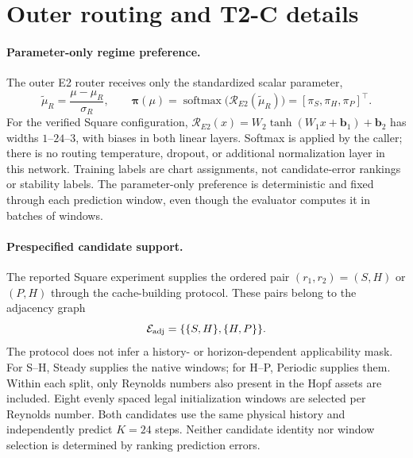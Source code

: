 \section{Outer routing and T2-C details}
\label{app:routing}

\paragraph{Parameter-only regime preference.}
The outer E2 router receives only the standardized scalar parameter,
\begin{equation}
  \widetilde\mu_R=\frac{\mu-\mu_R}{\sigma_R},\qquad
  \bm\pi(\mu)=\operatorname{softmax}
    \bigl(\mathcal R_{E2}(\widetilde\mu_R)\bigr)
  =[\pi_S,\pi_H,\pi_P]^\top.
  \label{eq:app_e2_parameter_only}
\end{equation}
For the verified Square configuration,
$\mathcal R_{E2}(x)=W_2\tanh(W_1x+\bm b_1)+\bm b_2$
has widths $1$--$24$--$3$, with biases in both linear layers.
Softmax is applied by the caller; there is no routing temperature,
dropout, or additional normalization layer in this network.
Training labels are chart assignments, not candidate-error rankings
or stability labels. The parameter-only preference is deterministic
and fixed through each prediction window, even though the evaluator
computes it in batches of windows.

\paragraph{Prespecified candidate support.}
The reported Square experiment supplies the ordered pair
$(r_1,r_2)=(S,H)$ or $(P,H)$ through the cache-building protocol.
These pairs belong to the adjacency graph
\begin{equation}
  \mathcal E_{\rm adj}=\{\{S,H\},\{H,P\}\}.
  \label{eq:app_adjacency}
\end{equation}
The protocol does not infer a history- or horizon-dependent
applicability mask. For S--H, Steady supplies the native windows;
for H--P, Periodic supplies them. Within each split, only Reynolds
numbers also present in the Hopf assets are included. Eight evenly
spaced legal initialization windows are selected per Reynolds number.
Both candidates use the same physical history and independently
predict $K=24$ steps. Neither candidate identity nor window selection
is determined by ranking prediction errors.

